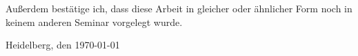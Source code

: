 \documentclass[
     11pt,         %
     a4paper,      %
     oneside,
     ]{article}
\begin{document}
Außerdem bestätige ich, dass diese Arbeit in gleicher oder ähnlicher Form noch in keinem anderen Seminar vorgelegt wurde.
\vspace*{50pt}

Heidelberg, den \today \hspace{2cm} \underline{\phantom{Platz für die Unterschrift}}
\newpage



\tableofcontents
\newpage













\newpage

\end{document}
